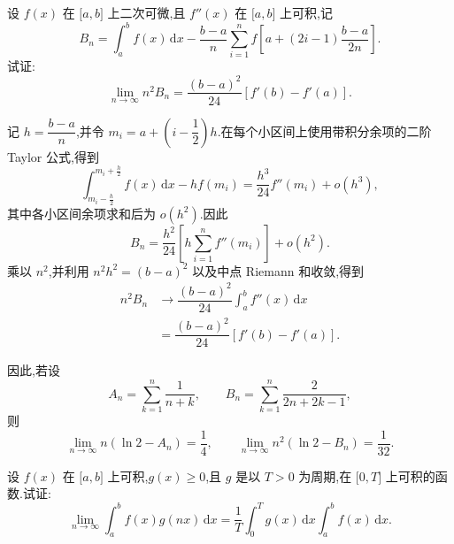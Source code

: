 \begin{example}[\markstar]
    设 $f(x)$ 在 $\lbrack a,b\rbrack$ 上二次可微,且 $f''(x)$ 在 $\lbrack a,b\rbrack$ 上可积,记
    \[
        B_n=\int_a^b f(x)\,\mathrm{d}x
        -\dfrac{b-a}{n}\sum\limits_{i=1}^n
        f\left[a+(2i-1)\dfrac{b-a}{2n}\right].
    \]
    试证:
    \[
        \displaystyle\lim\limits_{n\to\infty}n^2B_n
        =\dfrac{(b-a)^2}{24}[f'(b)-f'(a)].
    \]
\end{example}
\exampleblank

\begin{solution}
    记 $h=\dfrac{b-a}{n}$,并令 $m_i=a+\left(i-\dfrac{1}{2}\right)h$.在每个小区间上使用带积分余项的二阶 Taylor 公式,得到
    \[
        \displaystyle\int_{m_i-\frac{h}{2}}^{m_i+\frac{h}{2}}f(x)\,\mathrm{d}x
        -hf(m_i)
        =\dfrac{h^3}{24}f''(m_i)+o(h^3),
    \]
    其中各小区间余项求和后为 $o(h^2)$.因此
    \[
        B_n=\dfrac{h^2}{24}
        \left[h\sum\limits_{i=1}^{n}f''(m_i)\right]+o(h^2).
    \]
    乘以 $n^2$,并利用 $n^2h^2=(b-a)^2$ 以及中点 Riemann 和收敛,得到
    \[
        \begin{aligned}
            n^2B_n
             & \longrightarrow\dfrac{(b-a)^2}{24}
            \int_a^b f''(x)\,\mathrm{d}x          \\
             & =\dfrac{(b-a)^2}{24}[f'(b)-f'(a)].
        \end{aligned}
    \]
\end{solution}

\begin{remark}
    因此,若设
    \[
        A_n=\sum\limits_{k=1}^n\dfrac{1}{n+k},
        \qquad
        B_n=\sum\limits_{k=1}^n\dfrac{2}{2n+2k-1},
    \]
    则
    \[
        \displaystyle\lim\limits_{n\to\infty}n(\ln2-A_n)=\dfrac{1}{4},
        \qquad
        \lim\limits_{n\to\infty}n^2(\ln2-B_n)=\dfrac{1}{32}.
    \]
\end{remark}

\begin{example}[\markstar]
    设 $f(x)$ 在 $\lbrack a,b\rbrack$ 上可积,$g(x)\geq0$,且 $g$ 是以 $T>0$ 为周期,在 $\lbrack 0,T\rbrack$ 上可积的函数.试证:
    \[
        \displaystyle\lim\limits_{n\to\infty}\int_a^b f(x)g(nx)\,\mathrm{d}x
        =\dfrac{1}{T}\int_0^Tg(x)\,\mathrm{d}x\int_a^b f(x)\,\mathrm{d}x.
    \]
\end{example}
\exampleblank

